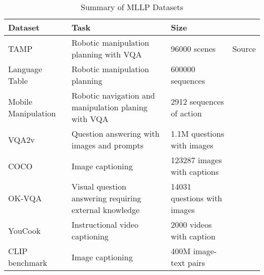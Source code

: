 \begin{table*}[!htb]
    \centering
    \scriptsize
    \begin{tabular}{l|l|l|l}
        \hline
        Dataset & Task & Size \\
        \hline
        TAMP & Robotic manipulation planning with VQA & 96000 scenes & Source\\
        Language Table & Robotic manipulation planning & 600000 sequences & \citet{DBLP:conf/icml/DriessXSLCIWTVY23}\\
        Mobile Manipulation & Robotic navigation and manipulation planing with VQA & 2912 sequences of action & \citet{DBLP:conf/icml/DriessXSLCIWTVY23}\\
        VQA2v & Question answering with images and prompts & 1.1M questions with images &\citet{DBLP:journals/ijcv/GoyalKASBP19}\\
        COCO & Image captioning & 123287 images with captions & \citet{DBLP:journals/corr/ChenFLVGDZ15}\\
        OK-VQA & Visual question answering requiring external knowledge & 14031 questions with images &\citet{DBLP:conf/cvpr/MarinoRFM19}\\
        YouCook & Instructional video captioning & 2000 videos with caption & \citet{DBLP:conf/iccv/SunMV0S19}\\
        CLIP benchmark & Image captioning & 400M image-text pairs & \citet{DBLP:conf/icml/RadfordKHRGASAM21}\\
        \hline
    \end{tabular}
    \caption{Summary of MLLP Datasets}
\end{table*}